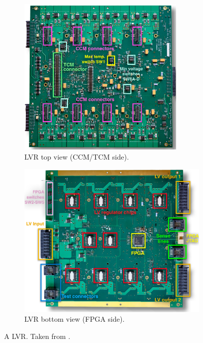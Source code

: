 \begin{figure}[!htb]
    \centering
    \begin{subfigure}[t]{0.48\textwidth}
        \centering
        \includegraphics[width=0.87\textwidth]{./figs-ut-upgrade/lvr/lvr_top_view.pdf}
        \caption{
            LVR top view (CCM/TCM side).
        }
    \end{subfigure}
    \hfill
    \begin{subfigure}[t]{0.48\textwidth}
        \centering
        \includegraphics[width=\textwidth]{./figs-ut-upgrade/lvr/lvr_bot_view.pdf}
        \caption{
            LVR bottom view (FPGA side).
        }
    \end{subfigure}

    \caption{
        A LVR.
        Taken from \cite{LVR_manual}.
    }
    \label{fig:lvr}
\end{figure}

